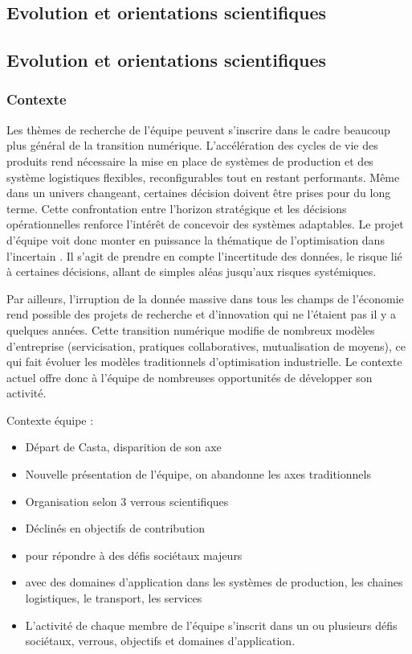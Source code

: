 		\subsection{Evolution et orientations scientifiques}
		

		\subsection{Evolution et orientations scientifiques}
		
		
			
		
		\subsubsection{Contexte}
		
		Les thèmes de recherche de l'équipe peuvent s'inscrire dans le cadre beaucoup plus général de la transition numérique. 
		L'accélération des cycles de vie des produits rend nécessaire la mise en place de systèmes de production et des système logistiques flexibles, reconfigurables tout en restant performants. 
		Même dans un univers changeant, certaines décision doivent être prises pour du long terme. 
		Cette confrontation entre l'horizon stratégique et les décisions opérationnelles renforce l'intérêt de concevoir des systèmes adaptables. 
		Le projet d'équipe voit donc monter en puissance la thématique de l'optimisation dans l'incertain . 
		Il s'agit de prendre en compte l'incertitude des données, le risque lié à certaines décisions, allant de simples aléas 	jusqu'aux risques systémiques. 
		
		Par ailleurs, l'irruption de la donnée massive dans tous les champs de l'économie rend possible des projets de recherche et d'innovation qui ne l'étaient pas il y a quelques années. 
		Cette transition numérique modifie de nombreux modèles d'entreprise (servicisation, pratiques collaboratives, mutualisation de moyens), ce qui fait évoluer les modèles traditionnels d'optimisation industrielle. 
		Le contexte actuel offre donc à l'équipe de nombreuses opportunités de développer son activité. 


	Contexte équipe : 
			
		\begin{itemize}
			\item Départ de Casta, disparition de son axe
			\item Nouvelle présentation de l'équipe, on abandonne les axes traditionnels
			\item Organisation selon 3 verrous scientifiques 
			\item Déclinés en objectifs de contribution
			\item pour répondre à des défis sociétaux majeurs
			\item avec des domaines d'application dans les systèmes de production, les chaines logistiques, le transport, les services
			\item L'activité de chaque membre de l'équipe s'inscrit dans un ou plusieurs défis sociétaux, verrous, objectifs et domaines d'application. 
		\end{itemize}
		
